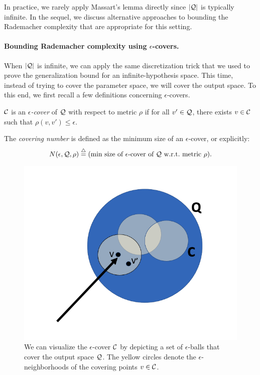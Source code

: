 In practice, we rarely apply Massart's lemma directly since $|\mathcal Q|$ is typically infinite. In the sequel, we discuss alternative approaches to bounding the Rademacher complexity that are appropriate for this setting.

\paragraph{Bounding Rademacher complexity using $\epsilon$-covers.}
When $|\mathcal Q|$ is infinite, we can apply the same discretization trick that we used to prove the generalization bound for an infinite-hypothesis space. This time, instead of trying to cover the parameter space, we will cover the output space. To this end, we first recall a few definitions concerning $\epsilon$-covers.

\begin{definition}
$\mathcal C$ is an \emph{$\epsilon$-cover} of $\mathcal Q$ with respect to metric $\rho$ if for all $v' \in \mathcal Q$, there exists $v \in \mathcal C $ such that $\rho(v,v')\le \epsilon$.
\end{definition}

\begin{definition}
The \emph{covering number} is defined as the minimum size of an $\epsilon$-cover, or explicitly:
\begin{align}
    N(\epsilon, \mathcal Q, \rho) \overset \triangle = (\text{min size of $\epsilon$-cover of $\mathcal Q$ w.r.t.\ metric $\rho$}).
\end{align}
\end{definition}

\begin{figure}[h]
	\begin{center}
		\includegraphics[width=.5\textwidth]{figures/onestep_bound.png}
	\end{center}
	\caption{We can visualize the $\epsilon$-cover $\mathcal C$ by depicting a set of $\epsilon$-balls that cover the output space $\mathcal Q$. The yellow circles denote the $\epsilon$-neighborhoods of the covering points $v \in \mathcal C$.
	}
	\label{lec9:fig:eps-cover}
\end{figure}

